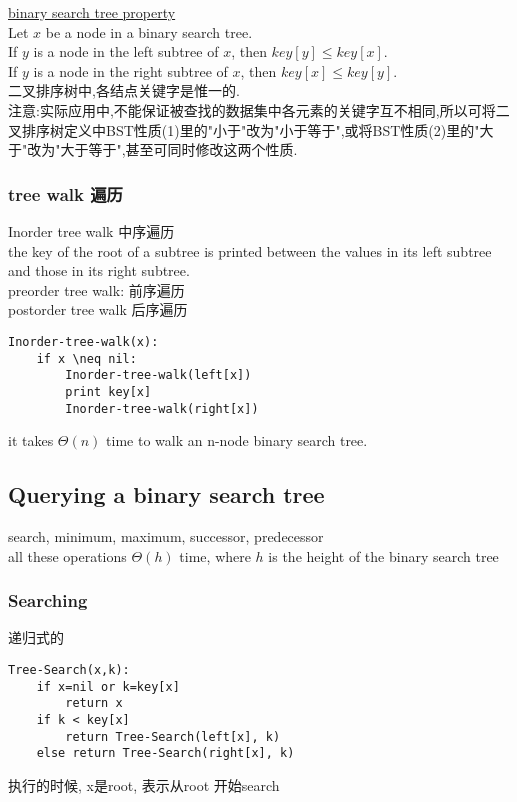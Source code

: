 \documentclass{article}
\begin{document}
\underline{binary search tree property}\\
Let $x$ be a node in a binary search tree.\\
If $y$ is a node in the left subtree of $x$, then $key[y] \leq key[x]$.\\
If $y$ is a node in the right subtree of $x$, then $key[x] \leq key[y]$.\\
二叉排序树中,各结点关键字是惟一的.\\
注意:实际应用中,不能保证被查找的数据集中各元素的关键字互不相同,所以可将二叉排序树定义中BST性质(1)里的"小于"改为"小于等于",或将BST性质(2)里的"大于"改为"大于等于",甚至可同时修改这两个性质.\\

\subsubsection{tree walk 遍历}
\noindent Inorder tree walk 中序遍历\\
the key of the root of a subtree is printed between the values in its left subtree and those in its right subtree.\\
preorder tree walk: 前序遍历\\
postorder tree walk  后序遍历

\begin{verbatim}
Inorder-tree-walk(x):
    if x \neq nil:
        Inorder-tree-walk(left[x])
        print key[x]
        Inorder-tree-walk(right[x])
\end{verbatim}

it takes $\Theta(n)$ time to walk an n-node binary search tree.

\subsection{Querying a binary search tree}
search, minimum, maximum, successor, predecessor\\
all these operations $\Theta(h)$ time, where $h$ is the height of the binary search tree

\subsubsection{Searching}
递归式的
\begin{verbatim}
Tree-Search(x,k):
    if x=nil or k=key[x]
        return x
    if k < key[x]
        return Tree-Search(left[x], k)
    else return Tree-Search(right[x], k)
\end{verbatim}
执行的时候, x是root, 表示从root 开始search
\end{document}
